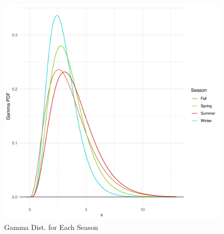 \documentclass{article}\usepackage[]{graphicx}\usepackage[]{xcolor}
\makeatletter
\def\maxwidth{ %
  \ifdim\Gin@nat@width>\linewidth
    \linewidth
  \else
    \Gin@nat@width
  \fi
}
\newenvironment{knitrout}{}{} %
\makeatother
\begin{document}
\begin{enumerate}
\begin{enumerate}
\begin{figure}[H]
\begin{center}
\begin{knitrout}
\includegraphics[width=\maxwidth]{figure/unnamed-chunk-4-1} 
\end{knitrout}
\caption{Gamma Dist. for Each Season}
\label{Figure 1}
\end{center}
\end{figure}
  \end{enumerate}
\end{enumerate}


\end{document}
